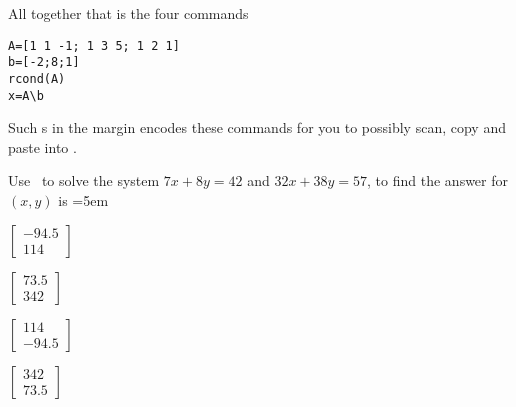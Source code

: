 \begin{example}
\begin{solution}
\begin{enumerate}
\end{enumerate}
All together that is the four commands
\begin{verbatim}
A=[1 1 -1; 1 3 5; 1 2 1]
b=[-2;8;1]
rcond(A)
x=A\b
\end{verbatim}
\setbox\ajrqrbox\hbox{}%
\marginpar{\usebox{\ajrqrbox\\[2ex]}}%
Such s in the margin encodes these commands for you to possibly scan, copy and paste into \script.
\end{solution}
\end{example}



\begin{activity}
Use \script\ to solve the system \(7x+8y=42\) and \(32x+38y=57\), to find the answer for \((x,y)\) is
\partswidth=5em
\begin{parts}
\item \(\begin{bmatrix} -94.5\\114 \end{bmatrix}\)
\item \(\begin{bmatrix} 73.5\\342 \end{bmatrix}\)
\item \(\begin{bmatrix} 114\\-94.5 \end{bmatrix}\)%
\item \(\begin{bmatrix} 342\\73.5 \end{bmatrix}\)
\end{parts}
\end{activity}





